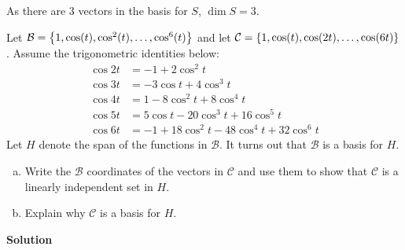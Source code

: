 \documentclass[11pt]{scrartcl}
\theoremstyle{dotlessP}
\theoremstyle{dotlessN}
\DeclarePairedDelimiter\set{\{}{\}}
\newcommand{\basis}{\mathcal{B}}
\begin{document}
As there are 3 vectors in the basis for $S$, $\dim S = 3$.
\begin{ques}
	Let $\basis = \set*{1, \cos(t), \cos^2(t),\dots, \cos^6(t)}$ and let $\mathcal{C} = \set*{1, \cos(t), \cos(2t), \dots, \cos(6t)}$. Assume the trigonometric identities below:
	\begin{align*}
		\cos 2t &= -1 + 2 \cos^2 t \\
		\cos 3t &= -3 \cos t + 4 \cos^3 t \\
		\cos 4t &= 1 - 8\cos^2 t + 8\cos^4 t \\
		\cos 5t &= 5 \cos t - 20\cos^3 t + 16 \cos^5 t \\
		\cos 6t &= -1 + 18\cos^2 t - 48\cos^4 t + 32 \cos^6 t
	\end{align*}
	Let $H$ denote the span of the functions in $\basis$. It turns out that $\basis$ is a basis for $H$. 
	\begin{enumerate}[a)]
		\item Write the $\basis$ coordinates of the vectors in $\mathcal{C}$ and use them to show that $\mathcal{C}$ is a linearly independent set in $H$. 
		\item Explain why $\mathcal{C}$ is a basis for $H$.
	\end{enumerate}
\end{ques}
\textbf{Solution}
\end{document}
